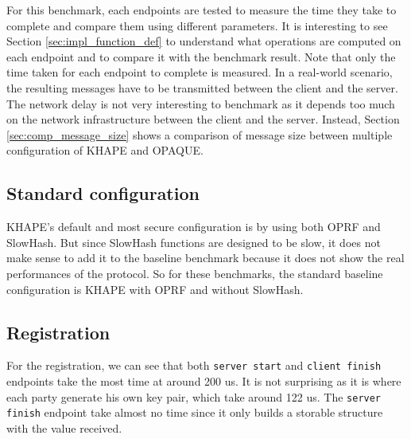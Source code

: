 ﻿\documentclass[../report.tex]{subfiles}
\begin{document}
For this benchmark, each endpoints are tested to measure the time they take to complete and compare them using different parameters. 
It is interesting to see Section \ref{sec:impl_function_def} to understand what operations are computed on each endpoint and to compare it with the benchmark result.
Note that only the time taken for each endpoint to complete is measured. In a real-world scenario, the resulting messages have to be transmitted between the client and the server. The network delay is not very interesting to benchmark as it depends too much on the network infrastructure between the client and the server. Instead, Section \ref{sec:comp_message_size} shows a comparison of message size between multiple configuration of KHAPE and OPAQUE.


\subsection{Standard configuration}
KHAPE's default and most secure configuration is by using both OPRF and SlowHash. 
But since SlowHash functions are designed to be slow, it does not make sense to add it to the baseline benchmark because it does not show the real performances of the protocol.
So for these benchmarks, the standard baseline configuration is KHAPE with OPRF and without SlowHash.


\pgfplotsset{width=\textwidth-1.1cm}


\subsection*{Registration}
For the registration, we can see that both \verb|server start| and \verb|client finish| endpoints take the most time at around 200 us.
It is not surprising as it is where each party generate his own key pair, which take around 122 us.
The \verb|server finish| endpoint take almost no time since it only builds a storable structure with the value received.


\end{document}
